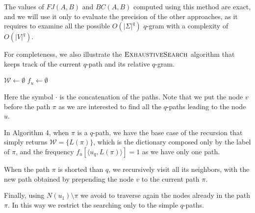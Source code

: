 The values of $FJ(A,B)$ and $BC(A,B)$ computed using this method are exact, and we will use it only to evaluate the precision of the other approaches, as it requires to examine all the possible $O(|\Sigma|^{q})$ $q$-gram with a complexity of $O(|V|^{q})$.\medskip
	
For completeness, we also illustrate the $\textsc{ExhaustiveSearch}$ algorithm that keeps track of the current $q$-path and its relative $q$-gram.
	
\begin{algorithm}[h]
	\small
	\DontPrintSemicolon
	\BlankLine
	$\mathcal{W} \gets \emptyset$\;
	$f_{u} \gets \emptyset$ \quad \;    
	\BlankLine
	\BlankLine
	\caption{$\textsc{ExhaustiveSearch}$}
	\label{alg:exhaustive-search}
\end{algorithm}

Here the symbol $\cdot$ is the concatenation of the paths. Note that we put the node $v$ before the path $\pi$ as we are interested to find all the $q$-paths leading to the node $u$.\medskip
	
In Algorithm 4, when $\pi$ is a $q$-path, we have the base case of the recursion that simply returns $\mathcal{W} = \{ L(\pi) \}$, which is the dictionary composed only by the label of $\pi$, and the frequency $f_{u}[\langle u_{q}, L(\pi) \rangle] = 1$ as we have only one path.
	
When the path $\pi$ is shorted than $q$, we recursively visit all its neighbors, with the new path obtained by prepending the node $v$ to the current path $\pi$.\medskip
	
\clearpage
	
Finally, using $N(u_{1}) \setminus \pi$ we avoid to traverse again the nodes already in the path $\pi$. In this way we restrict the searching only to the simple $q$-paths.
	
